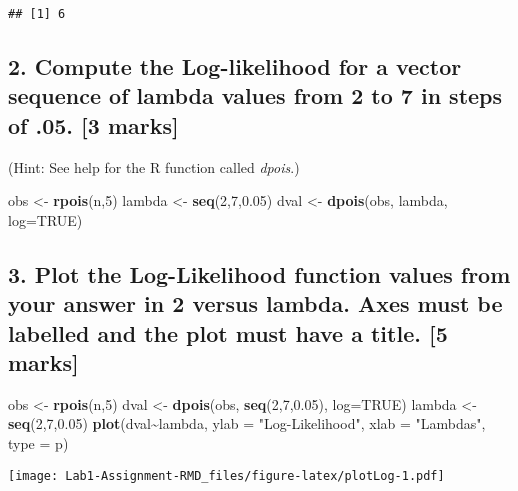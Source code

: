 \documentclass[
]{article}
\newenvironment{Shaded}{\begin{snugshade}}{\end{snugshade}}
\newcommand{\AttributeTok}[1]{\textcolor[rgb]{0.13,0.29,0.53}{#1}}
\newcommand{\ConstantTok}[1]{\textcolor[rgb]{0.56,0.35,0.01}{#1}}
\newcommand{\DecValTok}[1]{\textcolor[rgb]{0.00,0.00,0.81}{#1}}
\newcommand{\FloatTok}[1]{\textcolor[rgb]{0.00,0.00,0.81}{#1}}
\newcommand{\FunctionTok}[1]{\textcolor[rgb]{0.13,0.29,0.53}{\textbf{#1}}}
\newcommand{\NormalTok}[1]{#1}
\newcommand{\OtherTok}[1]{\textcolor[rgb]{0.56,0.35,0.01}{#1}}
\newcommand{\SpecialCharTok}[1]{\textcolor[rgb]{0.81,0.36,0.00}{\textbf{#1}}}
\newcommand{\StringTok}[1]{\textcolor[rgb]{0.31,0.60,0.02}{#1}}
\begin{document}
\begin{verbatim}
## [1] 6
\end{verbatim}

\hypertarget{compute-the-log-likelihood-for-a-vector-sequence-of-lambda-values-from-2-to-7-in-steps-of-.05.-3-marks}{%
\subsection{2. Compute the Log-likelihood for a vector sequence of
lambda values from 2 to 7 in steps of .05. {[}3
marks{]}}\label{compute-the-log-likelihood-for-a-vector-sequence-of-lambda-values-from-2-to-7-in-steps-of-.05.-3-marks}}

(Hint: See help for the R function called \emph{dpois}.)

\begin{Shaded}
\begin{Highlighting}[]
\NormalTok{obs }\OtherTok{\textless{}{-}} \FunctionTok{rpois}\NormalTok{(n,}\DecValTok{5}\NormalTok{)}
\NormalTok{lambda }\OtherTok{\textless{}{-}} \FunctionTok{seq}\NormalTok{(}\DecValTok{2}\NormalTok{,}\DecValTok{7}\NormalTok{,}\FloatTok{0.05}\NormalTok{)}
\NormalTok{dval }\OtherTok{\textless{}{-}} \FunctionTok{dpois}\NormalTok{(obs, lambda, }\AttributeTok{log=}\ConstantTok{TRUE}\NormalTok{)}
\end{Highlighting}
\end{Shaded}

\hypertarget{plot-the-log-likelihood-function-values-from-your-answer-in-2-versus-lambda.-axes-must-be-labelled-and-the-plot-must-have-a-title.-5-marks}{%
\subsection{3. Plot the Log-Likelihood function values from your answer
in 2 versus lambda. Axes must be labelled and the plot must have a
title. {[}5
marks{]}}\label{plot-the-log-likelihood-function-values-from-your-answer-in-2-versus-lambda.-axes-must-be-labelled-and-the-plot-must-have-a-title.-5-marks}}

\begin{Shaded}
\begin{Highlighting}[]
\NormalTok{obs }\OtherTok{\textless{}{-}} \FunctionTok{rpois}\NormalTok{(n,}\DecValTok{5}\NormalTok{)}
\NormalTok{dval }\OtherTok{\textless{}{-}} \FunctionTok{dpois}\NormalTok{(obs, }\FunctionTok{seq}\NormalTok{(}\DecValTok{2}\NormalTok{,}\DecValTok{7}\NormalTok{,}\FloatTok{0.05}\NormalTok{), }\AttributeTok{log=}\ConstantTok{TRUE}\NormalTok{)}
\NormalTok{lambda }\OtherTok{\textless{}{-}} \FunctionTok{seq}\NormalTok{(}\DecValTok{2}\NormalTok{,}\DecValTok{7}\NormalTok{,}\FloatTok{0.05}\NormalTok{)}
\FunctionTok{plot}\NormalTok{(dval}\SpecialCharTok{\textasciitilde{}}\NormalTok{lambda, }\AttributeTok{ylab =} \StringTok{"Log{-}Likelihood"}\NormalTok{, }\AttributeTok{xlab =} \StringTok{"Lambda\textquotesingle{}s"}\NormalTok{, }\AttributeTok{type =} \StringTok{\textquotesingle{}p\textquotesingle{}}\NormalTok{)}
\end{Highlighting}
\end{Shaded}

\texttt{[image: Lab1-Assignment-RMD\_files/figure-latex/plotLog-1.pdf]}
\end{document}
